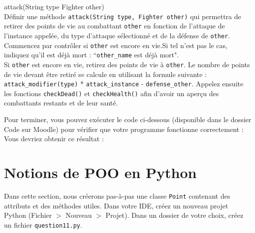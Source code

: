 \begin{Exercice}[10 minutes] attack(String type Fighter other)\\
    Définir une méthode \lstinline{attack(String type, Fighter other)} qui permettra de retirer des points de vie au combattant \lstinline{other} en fonction de l'attaque de l'instance appelée, du type d'attaque sélectionné et de la défense de \lstinline{other}. \\
    
    Commencez par contrôler si \lstinline{other} est encore en vie.Si tel n'est pas le cas, indiquez qu'il est déjà mort : ``\lstinline{other_name} est déjà mort". \\

     Si \lstinline{other} est encore en vie, retirez des points de vie à \lstinline{other}. Le nombre de points de vie devant être retiré se calcule en utilisant la formule suivante : \lstinline{attack_modifier(type)} * \lstinline{attack_instance} - \lstinline{defense_other}. Appelez ensuite les fonctions \lstinline{checkDead()} et \lstinline{checkHealth()} afin d'avoir un aperçu des combattants restants et de leur santé.
    


\begin{solution}
	
\end{solution}
\end{Exercice}


Pour terminer, vous pouvez exécuter le code ci-dessous (disponible dans le dossier Code sur Moodle) pour vérifier que votre programme fonctionne correctement : \\



Vous devriez obtenir ce résultat : \\



\newpage

\section{Notions de POO en Python}
Dans cette section, nous créerons pas-à-pas une classe \lstinline{Point} contenant des attributs et des méthodes utiles.
Dans votre IDE, créez un nouveau projet Python (Fichier $>$ Nouveau $>$ Projet). Dans un dossier de votre choix, créez un fichier \lstinline{question11.py}.\\

